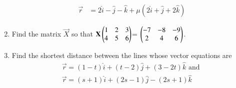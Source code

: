 \begin{enumerate}[label=\thesubsection.\arabic*,ref=\thesubsection.\theenumi]
\begin{align}
	\\
	\overrightarrow{r}&=2\hat{i}-\hat{j}-\hat{k}+\mu(2\hat{i}+\hat{j}+2\hat{k})
\end{align}
\item Find the matrix $\vec{X}$ so that $\mathbf{X}\begin{pmatrix}1&2&3\\ 4&5&6\end{pmatrix}$= $\begin{pmatrix}-7&-8&-9\\ 2&4&6\end{pmatrix}$.
\item Find the shortest distance between the lines whose vector equations are 
\begin{align} 
\overrightarrow{r}=(1-t)\hat{i}+(t-2)\hat{j}+(3-2t)\hat{k} \text{ and }\\ \overrightarrow{r}=(s+1)\hat{i}+(2s-1)\hat{j}-(2s+1)\hat{k}
\end{align}
\end{enumerate}
